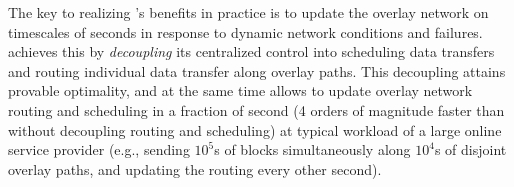 

The key to realizing \name's benefits in practice is to update 
the overlay network 
on timescales of seconds in response to dynamic network conditions
and failures.
\name achieves this by {\em decoupling} its centralized control
into scheduling data transfers and
routing individual data transfer along overlay paths.
This decoupling attains provable optimality, and at the same time 
allows \name to update overlay network routing and scheduling in 
a fraction
of second (4 orders of magnitude faster than without decoupling
routing and scheduling) at typical workload
of a large online service provider (e.g., sending $10^5$s of blocks
simultaneously along $10^4$s of disjoint overlay paths, and updating
the routing every other second).


